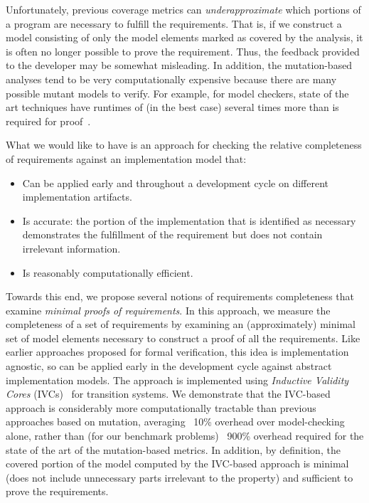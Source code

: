 Unfortunately, previous coverage metrics can {\em underapproximate} which portions of a program are necessary to fulfill the requirements.  That is, if we construct a model consisting of only the model elements marked as covered by the analysis, it is often no longer possible to prove the requirement.  Thus, the feedback provided to the developer may be somewhat misleading.
In addition, the mutation-based analyses tend to be very computationally expensive because there are many possible mutant models to verify.  For example, for model checkers, state of the art techniques have runtimes of (in the best case) several times more than is required for proof~\cite{chockler2010coverage}.

What we would like to have is an approach for checking the relative completeness of requirements against an implementation model that:
\begin{itemize}
    \item Can be applied early and throughout a development cycle on different implementation artifacts.
    \item Is accurate: the portion of the implementation that is identified as necessary demonstrates the
        fulfillment of the requirement but does not contain irrelevant information.
    \item Is reasonably computationally efficient.
\end{itemize}

\noindent Towards this end, we propose several notions of requirements completeness that examine {\em minimal proofs of requirements}.  In this approach, we measure the completeness of a set of requirements by examining an (approximately) minimal set of model elements necessary to construct a proof of all the requirements.  Like earlier approaches proposed for formal verification, this idea is implementation agnostic, so can be applied early in the development cycle against abstract implementation models.  The approach is implemented using {\em Inductive Validity Cores} (IVCs)~\cite{Ghass16} for transition systems.  We demonstrate that the IVC-based approach is considerably more computationally tractable than previous approaches based on mutation, averaging ~10\% overhead over model-checking alone, rather than (for our benchmark problems) ~900\% overhead required for the state of the art of the mutation-based metrics.  In addition, by definition, the covered portion of the model computed by the IVC-based approach is minimal (does not include unnecessary parts irrelevant to the property) and sufficient to prove the requirements.

